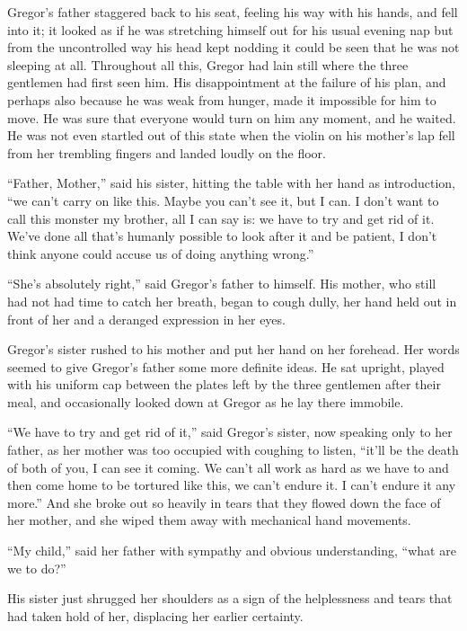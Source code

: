 \documentclass[12pt]{report}
\begin{document}
Gregor's father staggered back to his seat, feeling his way with his
hands, and fell into it; it looked as if he was stretching himself out
for his usual evening nap but from the uncontrolled way his head kept
nodding it could be seen that he was not sleeping at all. Throughout all
this, Gregor had lain still where the three gentlemen had first seen
him. His disappointment at the failure of his plan, and perhaps also
because he was weak from hunger, made it impossible for him to move. He
was sure that everyone would turn on him any moment, and he waited. He
was not even startled out of this state when the violin on his mother's
lap fell from her trembling fingers and landed loudly on the floor.

``Father, Mother,'' said his sister, hitting the table with her hand as
introduction, ``we can't carry on like this. Maybe you can't see it, but
I can. I don't want to call this monster my brother, all I can say is:
we have to try and get rid of it. We've done all that's humanly possible
to look after it and be patient, I don't think anyone could accuse us of
doing anything wrong.''

``She's absolutely right,'' said Gregor's father to himself. His mother,
who still had not had time to catch her breath, began to cough dully,
her hand held out in front of her and a deranged expression in her eyes.

Gregor's sister rushed to his mother and put her hand on her forehead.
Her words seemed to give Gregor's father some more definite ideas. He
sat upright, played with his uniform cap between the plates left by the
three gentlemen after their meal, and occasionally looked down at Gregor
as he lay there immobile.

``We have to try and get rid of it,'' said Gregor's sister, now speaking
only to her father, as her mother was too occupied with coughing to
listen, ``it'll be the death of both of you, I can see it coming. We
can't all work as hard as we have to and then come home to be tortured
like this, we can't endure it. I can't endure it any more.'' And she
broke out so heavily in tears that they flowed down the face of her
mother, and she wiped them away with mechanical hand movements.

``My child,'' said her father with sympathy and obvious understanding,
``what are we to do?''

His sister just shrugged her shoulders as a sign of the helplessness and
tears that had taken hold of her, displacing her earlier certainty.
\end{document}
